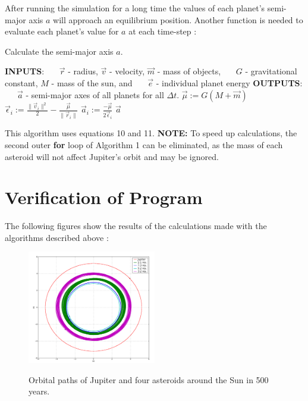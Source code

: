 \documentclass{article}%
\begin{document}
After running the simulation for a long time the values of each planet's semi-major axis $a$ will approach an equilibrium position.  Another function is needed to evaluate each planet's value for $a$ at each time-step :

\begin{algorithm}[h!]
  \caption{Calculate the semi-major axis $a$.}
  \begin{algorithmic} 
  \STATE \textbf{INPUTS}: 
  \STATE \ \ \ $\vec r$ - radius, $\vec v$ - velocity, $\vec m$ - mass of objects,
  \STATE \ \ \ $G$ - gravitational constant, $M$ - mass of the sun, and
  \STATE \ \ \ $\vec e$ - individual planet energy
  \STATE \textbf{OUTPUTS}: 
  \STATE \ \ \ $\vec a$ - semi-major axes of all planets for all $\Delta t$.
    \STATE $\vec \mu := G(M + \vec m)$
      \STATE $\vec \epsilon_i := \frac{\|\vec v_i\|^2}{2} - 
                                 \frac{\vec \mu}{\|\vec r_i\|}$
      \STATE $\vec a_i := \frac{-\vec \mu}{2\vec \epsilon_i}$
    \ENDFOR
    \RETURN $\vec a$
  \end{algorithmic}
\end{algorithm}

This algorithm uses equations 10 and 11.
\textbf{NOTE:} To speed up calculations, the second outer \textbf{for} loop of Algorithm 1 can be eliminated, as the mass of each asteroid will not affect Jupiter's orbit and may be ignored.  

\section{Verification of Program}
The following figures show the results of the calculations made with the algorithms described above :

\begin{figure}[H]
	\centering
		\includegraphics[width=0.50\textwidth]{images/kirkwood500yr.png}
	\label{fig:500 year orbit}
	\caption{Orbital paths of Jupiter and four asteroids around the Sun in 500 years.}
\end{figure}
\end{document}

